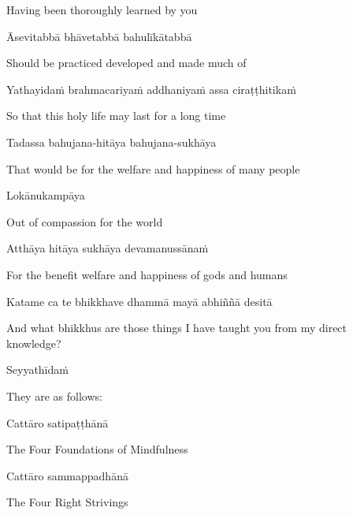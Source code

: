 \begin{english}
  Having been thoroughly learned by you
\end{english}

Āsevitabbā bhāvetabbā bahulīkātabbā

\begin{english}
  Should be practiced developed and made much of
\end{english}

Yathayidaṁ brahmacariyaṁ addhaniyaṁ assa ciraṭṭhitikaṁ

\begin{english}
  So that this holy life may last for a long time
\end{english}

Tadassa bahujana-hitāya bahujana-sukhāya

\begin{english}
  That would be for the welfare and happiness of many people
\end{english}

Lokānukampāya

\begin{english}
  Out of compassion for the world
\end{english}

Atthāya hitāya sukhāya devamanussānaṁ

\begin{english}
  For the benefit welfare and happiness of gods and humans
\end{english}

Katame ca te bhikkhave dhammā mayā abhiññā desitā

\begin{english}
  And what bhikkhus are those things I have taught you from my direct knowledge?
\end{english}

Seyyathīdaṁ

\begin{english}
  They are as follows:
\end{english}

Cattāro satipaṭṭhānā

\begin{english}
  The Four Foundations of Mindfulness
\end{english}

Cattāro sammappadhānā

\begin{english}
  The Four Right Strivings
\end{english}

